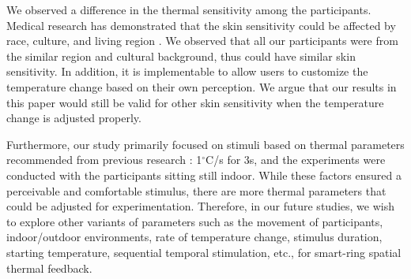 \documentclass[preprint,12pt]{elsarticle}
\begin{document}
We observed a difference in the thermal sensitivity among the participants. Medical research has demonstrated that the skin sensitivity could be affected by race, culture, and living region \cite{17}. We observed that all our participants were from the similar region and cultural background, thus could have similar skin sensitivity. In addition, it is implementable to allow users to customize the temperature change based on their own perception. We argue that our results in this paper would still be valid for other skin sensitivity when the temperature change is adjusted properly.

Furthermore, our study primarily focused on stimuli based on thermal parameters recommended from previous research \cite{42}: 1$^{\circ}$C/s for 3s, and the experiments were conducted with the participants sitting still indoor. While these factors ensured a perceivable and comfortable stimulus, there are more thermal parameters that could be adjusted for experimentation. Therefore, in our future studies, we wish to explore other variants of parameters such as the movement of participants, indoor/outdoor environments, rate of temperature change, stimulus duration, starting temperature, sequential temporal stimulation, etc., for smart-ring spatial thermal feedback.
\end{document}
